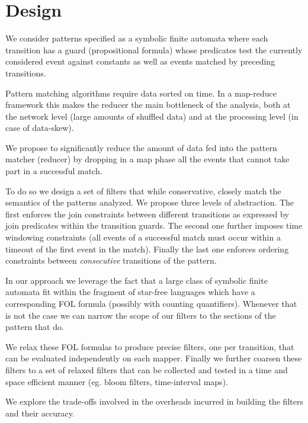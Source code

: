 \section{Design}

We consider patterns specified as a symbolic finite automata where each
transition has a guard (propositional formula) whose predicates test the
currently considered event against constants as well as events matched by
preceding transitions.
   
Pattern matching algorithms require data sorted on time.
In a map-reduce framework this makes the reducer the main bottleneck of the
analysis, both at the network level (large amounts of shuffled data) and at
the processing level (in case of data-skew).



We propose to significantly reduce the amount of data fed into the pattern
matcher (reducer) by dropping in a map phase all the events that cannot take
part in a successful match.

To do so we design a set of filters that while conservative, closely match the
semantics of the patterns analyzed.
We propose three levels of abstraction.
The first enforces the join constraints between different transitions as
expressed by join predicates within the transition guards.
The second one further imposes time windowing constraints (all events of a
successful match must occur within a timeout of the first event in the match).
Finally the last one enforces ordering constraints between {\em consecutive}
transitions of the pattern.

In our approach we leverage the fact that a large class of symbolic finite
automata fit within the fragment of star-free languages which
have a corresponding FOL formula (possibly with counting quantifiers).
Whenever that is not the case we can narrow the scope of our filters to the
sections of the pattern that do.
 
We relax these FOL formulas to produce precise filters, one per transition, 
that can be evaluated independently on each mapper.
Finally we further coarsen these filters to a set of relaxed filters
that can be collected and tested in a time and space efficient manner (eg. bloom
filters, time-interval maps).

We explore the trade-offs involved in the overheads incurred in building the
filters and their accuracy. 







